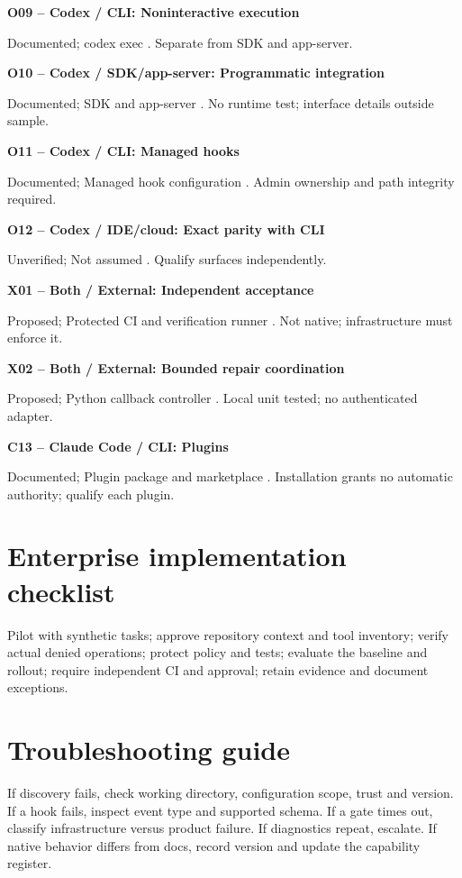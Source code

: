 \documentclass[11pt,letterpaper]{article}
\begin{document}
\textbf{O09 -- Codex / CLI: Noninteractive execution}\par Documented; codex exec \cite{oexec}. Separate from SDK and app-server.

\textbf{O10 -- Codex / SDK/app-server: Programmatic integration}\par Documented; SDK and app-server \cite{oplatform}. No runtime test; interface details outside sample.

\textbf{O11 -- Codex / CLI: Managed hooks}\par Documented; Managed hook configuration \cite{ohooks}. Admin ownership and path integrity required.

\textbf{O12 -- Codex / IDE/cloud: Exact parity with CLI}\par Unverified; Not assumed \cite{osec}. Qualify surfaces independently.

\textbf{X01 -- Both / External: Independent acceptance}\par Proposed; Protected CI and verification runner \cite{github}. Not native; infrastructure must enforce it.

\textbf{X02 -- Both / External: Bounded repair coordination}\par Proposed; Python callback controller \cite{openai}. Local unit tested; no authenticated adapter.

\textbf{C13 -- Claude Code / CLI: Plugins}\par Documented; Plugin package and marketplace \cite{cplugin}. Installation grants no automatic authority; qualify each plugin.

\clearpage\section{Enterprise implementation checklist}
Pilot with synthetic tasks; approve repository context and tool inventory; verify actual denied operations; protect policy and tests; evaluate the baseline and rollout; require independent CI and approval; retain evidence and document exceptions.

\clearpage\section{Troubleshooting guide}
If discovery fails, check working directory, configuration scope, trust and version. If a hook fails, inspect event type and supported schema. If a gate times out, classify infrastructure versus product failure. If diagnostics repeat, escalate. If native behavior differs from docs, record version and update the capability register.
\end{document}
